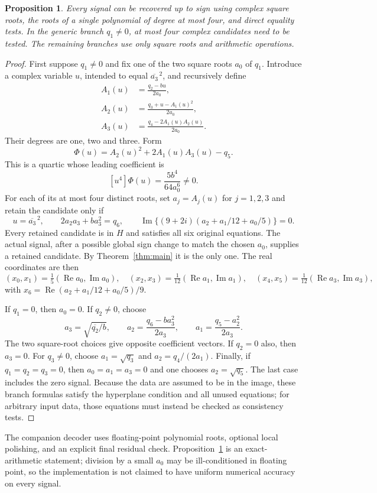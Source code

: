 \documentclass[11pt]{article}
\newtheorem{proposition}[theorem]{Proposition}
\theoremstyle{remark}\newtheorem{remark}[theorem]{Remark}
\newcommand{\im}{\operatorname{Im}}\newcommand{\re}{\operatorname{Re}}
\begin{document}
\begin{proposition}\label{prop:decoder}
Every signal can be recovered up to sign using complex square roots, the roots of a single polynomial of degree at most four, and direct equality tests. In the generic branch $q_1\ne0$, at most four complex candidates need to be tested. The remaining branches use only square roots and arithmetic operations.
\end{proposition}
\begin{proof}
First suppose $q_1\ne0$ and fix one of the two square roots $a_0$ of $q_1$. Introduce a complex variable $u$, intended to equal $\overline{a_3}^{\,2}$, and recursively define
\begin{align*}
 A_1(u)&=\frac{q_2-bu}{2a_0},\\
 A_2(u)&=\frac{q_3+u-A_1(u)^2}{2a_0},\\
 A_3(u)&=\frac{q_4-2A_1(u)A_2(u)}{2a_0}.
\end{align*}
Their degrees are one, two and three. Form
\[
 \Phi(u)=A_2(u)^2+2A_1(u)A_3(u)-q_5.
\]
This is a quartic whose leading coefficient is
\[
 [u^4]\Phi(u)=\frac{5b^4}{64a_0^6}\ne0.
\]
For each of its at most four distinct roots, set $a_j=A_j(u)$ for $j=1,2,3$ and retain the candidate only if
\[
 u=\overline{a_3}^{\,2},\qquad
 2a_2a_3+ba_3^2=q_6,\qquad
 \im\{(9+2i)(a_2+a_1/12+a_0/5)\}=0.
\]
Every retained candidate is in $H$ and satisfies all six original equations. The actual signal, after a possible global sign change to match the chosen $a_0$, supplies a retained candidate. By Theorem~\ref{thm:main} it is the only one. The real coordinates are then
\[
 (x_0,x_1)=\tfrac15(\re a_0,\im a_0),\quad
 (x_2,x_3)=\tfrac1{12}(\re a_1,\im a_1),\quad
 (x_4,x_5)=\tfrac1{12}(\re a_3,\im a_3),
\]
with $x_6=\re(a_2+a_1/12+a_0/5)/9$.

If $q_1=0$, then $a_0=0$. If $q_2\ne0$, choose
\[
 a_3=\sqrt{\overline{q_2}/b},\qquad
 a_2=\frac{q_6-ba_3^2}{2a_3},\qquad
 a_1=\frac{q_5-a_2^2}{2a_3}.
\]
The two square-root choices give opposite coefficient vectors. If $q_2=0$ also, then $a_3=0$. For $q_3\ne0$, choose $a_1=\sqrt{q_3}$ and $a_2=q_4/(2a_1)$. Finally, if $q_1=q_2=q_3=0$, then $a_0=a_1=a_3=0$ and one chooses $a_2=\sqrt{q_5}$. The last case includes the zero signal. Because the data are assumed to be in the image, these branch formulas satisfy the hyperplane condition and all unused equations; for arbitrary input data, those equations must instead be checked as consistency tests.
\end{proof}

The companion decoder uses floating-point polynomial roots, optional local polishing, and an explicit final residual check. Proposition~\ref{prop:decoder} is an exact-arithmetic statement; division by a small $a_0$ may be ill-conditioned in floating point, so the implementation is not claimed to have uniform numerical accuracy on every signal.
\end{document}
